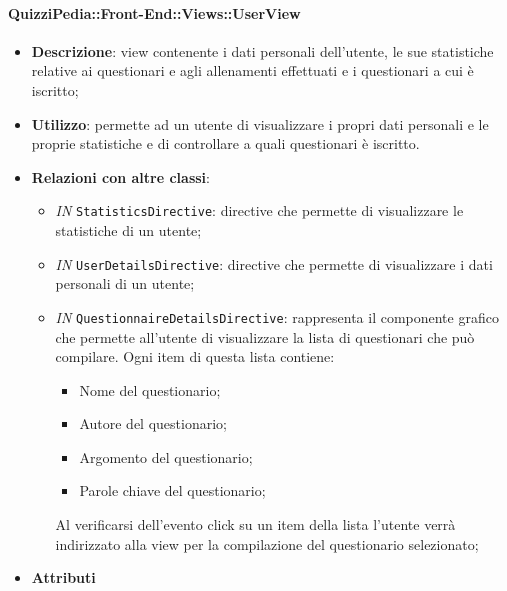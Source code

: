 \paragraph{QuizziPedia::Front-End::Views::UserView}
\begin{itemize}
	\item \textbf{Descrizione}: view contenente i dati personali dell'utente, le sue statistiche relative ai questionari e agli allenamenti effettuati e i questionari a cui è iscritto;
	\item \textbf{Utilizzo}:  permette ad un utente di visualizzare i propri dati personali e le proprie statistiche e di controllare a quali questionari è iscritto. 
	\item \textbf{Relazioni con altre classi}:
	\begin{itemize}
		\item \textit{IN} \texttt{StatisticsDirective}: directive che permette di visualizzare le statistiche di un utente;
		\item \textit{IN} \texttt{UserDetailsDirective}: directive che permette di visualizzare i dati personali di un utente;
		\item \textit{IN} \texttt{QuestionnaireDetailsDirective}: rappresenta il componente grafico che permette all'utente di visualizzare la lista di questionari che può compilare. Ogni item di questa lista contiene:
		\begin{itemize} 
		\item Nome del questionario;
		\item Autore del questionario;
		\item Argomento del questionario;
		\item Parole chiave del questionario;
		\end{itemize}
		Al verificarsi dell'evento click su un item della lista l'utente verrà indirizzato alla view per
		la compilazione del questionario selezionato;
	\end{itemize}
	\item \textbf{Attributi}
\end{itemize}

